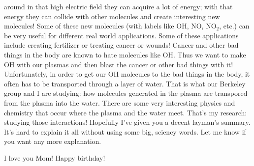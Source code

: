 \documentclass[11pt]{article}
\begin{document}
around in that high electric field they can acquire a lot of energy; with that energy they can collide with other molecules and create interesting new molecules! Some of these new molecules (with labels like OH, NO, NO$_2$, etc.) can be very useful for different real world applications. Some of these applications include creating fertilizer or treating cancer or wounds! Cancer and other bad things in the body are known to hate molecules like OH. Thus we want to make OH with our plasmas and then blast the cancer or other bad things with it! Unfortunately, in order to get our OH molecules to the bad things in the body, it often has to be transported through a layer of water. That is what our Berkeley group and I are studying: how molecules generated in the plasma are transpored from the plasma into the water. There are some very interesting physics and chemistry that occur where the plasma and the water meet. That's my research: studying those interactions! Hopefully I've given you a decent layman's summary. It's hard to explain it all without using some big, sciency words. Let me know if you want any more explanation.

I love you Mom! Happy birthday!
\end{document}
